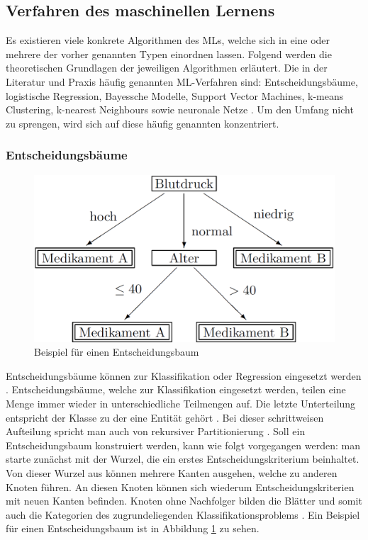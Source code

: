 \subsection{Verfahren des maschinellen Lernens}
\label{subsubsec_Verfahren}
Es existieren viele konkrete Algorithmen des MLs, welche sich in eine oder mehrere der vorher genannten Typen einordnen lassen. Folgend werden die theoretischen Grundlagen der jeweiligen Algorithmen erläutert. Die in der Literatur und Praxis häufig genannten ML-Verfahren sind: Entscheidungsbäume, logistische Regression, Bayessche Modelle, Support Vector Machines, k-means Clustering, k-nearest Neighbours sowie neuronale Netze \cite{alzubi2018machine, MicrosoftML, dobel2018maschinelles, sarker2021machine}.  Um den Umfang nicht zu sprengen, wird sich auf diese häufig genannten konzentriert.

\subsubsection{Entscheidungsbäume}
\label{chap_dectree}
\begin{figure}
    \centering
    \includegraphics[scale=0.33]{pic/MA-Bilder/Entscheidungsbaum.PNG}
    \caption{Beispiel für einen Entscheidungsbaum \cite{borgelt1998attributauswahlmasse}}
    \label{Fig:dectree}
\end{figure}
Entscheidungsbäume können zur Klassifikation oder Regression eingesetzt werden \cite{Wuttke.2022}. Entscheidungsbäume, welche zur Klassifikation eingesetzt werden, teilen eine Menge immer wieder in unterschiedliche Teilmengen auf. Die letzte Unterteilung entspricht der Klasse zu der eine Entität gehört \cite{Breiman.2017}. Bei dieser schrittweisen Aufteilung spricht man auch von rekursiver Partitionierung \cite{Ng.2018}. Soll ein Entscheidungsbaum konstruiert werden, kann wie folgt vorgegangen werden: man starte zunächst mit der Wurzel, die ein erstes Entscheidungskriterium beinhaltet. Von dieser Wurzel aus können mehrere Kanten ausgehen, welche zu anderen Knoten führen. An diesen Knoten können sich wiederum Entscheidungskriterien mit neuen Kanten befinden. Knoten ohne Nachfolger bilden die Blätter und somit auch die Kategorien des zugrundeliegenden Klassifikationsproblems \cite{Wuttke.2022}. Ein Beispiel für einen Entscheidungsbaum ist in Abbildung \ref{Fig:dectree} zu sehen.

